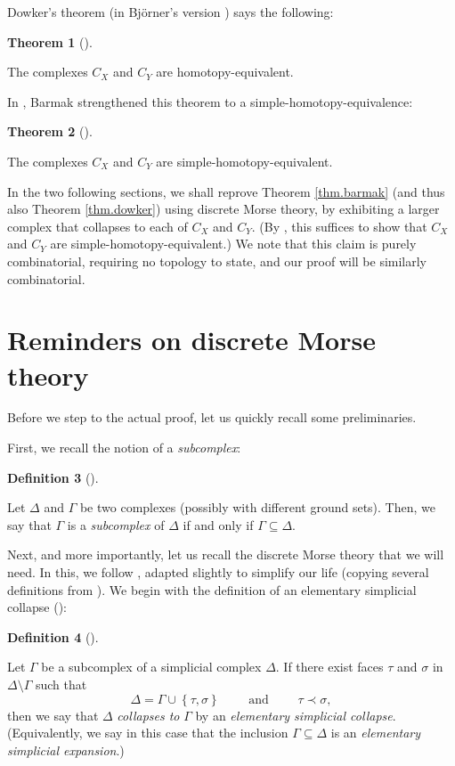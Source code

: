 \documentclass[numbers=enddot,12pt,final,onecolumn,notitlepage]{scrartcl}%
\theoremstyle{definition}
\newtheorem{theo}{Theorem}[section]
\newenvironment{theorem}[1][]
{\begin{theo}[#1]\begin{leftbar}}
{\end{leftbar}\end{theo}}
\newtheorem{defi}[theo]{Definition}
\newenvironment{definition}[1][]
{\begin{defi}[#1]\begin{leftbar}}
{\end{leftbar}\end{defi}}
\newcommand{\set}[1]{\left\{ #1 \right\}}
\begin{document}
Dowker's theorem (in Bj\"{o}rner's version \cite[Theorem 10.9]{Bjorne95}) says
the following:

\begin{theorem}
[Dowker's theorem]\label{thm.dowker}The complexes $C_{X}$ and $C_{Y}$ are homotopy-equivalent.
\end{theorem}

In \cite[Theorem 4.4]{Barmak11}, Barmak strengthened this theorem to a
simple-homotopy-equivalence:

\begin{theorem}
\label{thm.barmak}The complexes $C_{X}$ and $C_{Y}$ are
simple-homotopy-equivalent. %
\end{theorem}

In the two following sections, we shall reprove Theorem \ref{thm.barmak} (and
thus also Theorem \ref{thm.dowker}) using discrete Morse theory, by exhibiting
a larger complex that collapses to each of $C_{X}$ and $C_{Y}$. (By
\cite[Proposition 9.28]{Kozlov20}, this suffices to show that $C_{X}$ and
$C_{Y}$ are simple-homotopy-equivalent.) We note that this claim is purely
combinatorial, requiring no topology to state, and our proof will be similarly combinatorial.


\section{Reminders on discrete Morse theory}

Before we step to the actual proof, let us quickly recall some preliminaries.

First, we recall the notion of a \emph{subcomplex}:

\begin{definition}
Let $\Delta$ and $\Gamma$ be two complexes (possibly with different ground
sets). Then, we say that $\Gamma$ is a \emph{subcomplex} of $\Delta$ if and
only if $\Gamma\subseteq\Delta$.
\end{definition}

Next, and more importantly, let us recall the discrete Morse theory that we
will need. In this, we follow \cite[Chapter 10]{Kozlov20}, adapted slightly to
simplify our life (copying several definitions from \cite[\S 7]{GrKaLe21}). We
begin with the definition of
an elementary simplicial collapse %
(\cite[\S 9.1]{Kozlov20}):

\begin{definition}
  \label{def.elementary.collapse}
  Let $\Gamma$ be a subcomplex of a simplicial complex $\Delta$. If there 
  exist faces $\tau$ and $\sigma$ in $\Delta \setminus \Gamma$
  such that
  \[
  \Delta = \Gamma \cup \set{\tau, \sigma}
  \qquad \text{ and } \qquad \tau \prec \sigma ,
  \]
  then we say that $\Delta$ \emph{collapses to} $\Gamma$
  by an \emph{elementary simplicial collapse}.
  (Equivalently, we say in this case that
  the inclusion $\Gamma \subseteq \Delta$ is an
  \emph{elementary simplicial expansion}.)
\end{definition}
\end{document}
